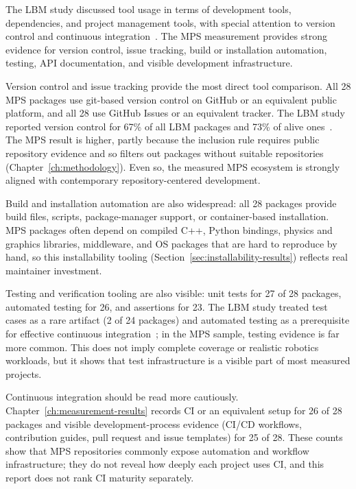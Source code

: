 The LBM study discussed tool usage in terms of development tools, dependencies, and project management tools, with special attention to version control and continuous integration~\citep{Smith2024LBM}. The MPS measurement provides strong evidence for version control, issue tracking, build or installation automation, testing, API documentation, and visible development infrastructure.

Version control and issue tracking provide the most direct tool comparison. All 28 MPS packages use git-based version control on GitHub or an equivalent public platform, and all 28 use GitHub Issues or an equivalent tracker. The LBM study reported version control for 67\% of all LBM packages and 73\% of alive ones~\citep{Smith2024LBM}. The MPS result is higher, partly because the inclusion rule requires public repository evidence and so filters out packages without suitable repositories (Chapter~\ref{ch:methodology}). Even so, the measured MPS ecosystem is strongly aligned with contemporary repository-centered development.

Build and installation automation are also widespread: all 28 packages provide build files, scripts, package-manager support, or container-based installation. MPS packages often depend on compiled C++, Python bindings, physics and graphics libraries, middleware, and OS packages that are hard to reproduce by hand, so this installability tooling (Section~\ref{sec:installability-results}) reflects real maintainer investment.

Testing and verification tooling are also visible: unit tests for 27 of 28 packages, automated testing for 26, and assertions for 23. The LBM study treated test cases as a rare artifact (2 of 24 packages) and automated testing as a prerequisite for effective continuous integration~\citep{Smith2024LBM}; in the MPS sample, testing evidence is far more common. This does not imply complete coverage or realistic robotics workloads, but it shows that test infrastructure is a visible part of most measured projects.

Continuous integration should be read more cautiously. Chapter~\ref{ch:measurement-results} records CI or an equivalent setup for 26 of 28 packages and visible development-process evidence (CI/CD workflows, contribution guides, pull request and issue templates) for 25 of 28. These counts show that MPS repositories commonly expose automation and workflow infrastructure; they do not reveal how deeply each project uses CI, and this report does not rank CI maturity separately.

